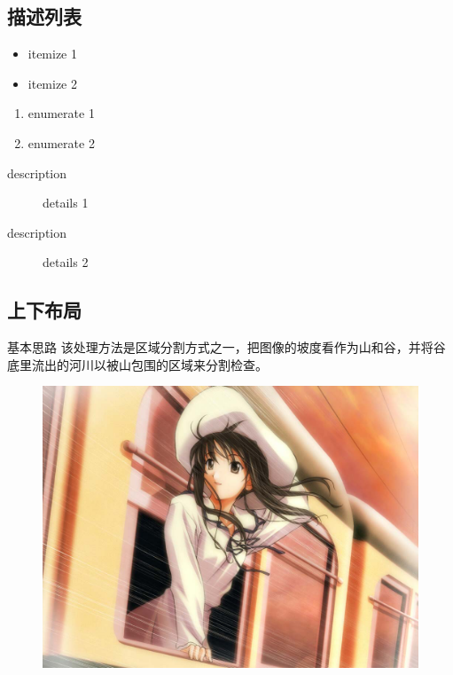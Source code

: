 \documentclass{./banyuan-ppt}
\begin{document}
\subsection{描述列表}
\begin{frame}
    \begin{itemize}
        \item itemize 1
        \item itemize 2
    \end{itemize}

    \begin{enumerate}
        \item enumerate 1
        \item enumerate 2
    \end{enumerate}

    \begin{description}
        \item[description] details 1
        \item[description] details 2
    \end{description}
\end{frame}

\subsection{上下布局}
\begin{frame}
    \begin{block}{基本思路}
        该处理方法是区域分割方式之一，把图像的坡度看作为山和谷，并将谷底里流出的河川以被山包围的区域来分割检查。
    \end{block}

    \begin{figure}
        \includegraphics[width=\midpicwidth]{./res/sample.png}
    \end{figure}
\end{frame}
\end{document}

